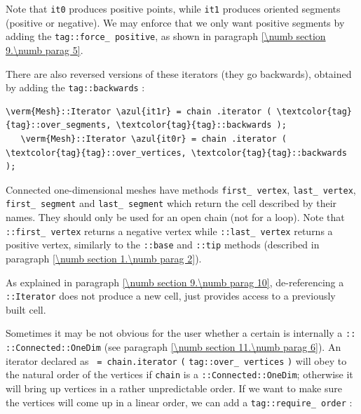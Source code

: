 Note that {\small\tt it0} produces positive points, while {\small\tt  it1} produces
oriented segments (positive or negative).
We may enforce that we only want positive segments by adding the
{\small\tt \textcolor{tag}{tag}::force\_\,positive}, as shown in paragraph \ref{\numb section 9.\numb parag 5}.

There are also reversed versions of these iterators (they go backwards), obtained by adding
the {\small\tt \textcolor{tag}{tag}::backwards} :

\begin{Verbatim}[commandchars=\\\{\},formatcom=\small\tt,
   baselinestretch=0.94,framesep=2mm                      ]
   \verm{Mesh}::Iterator \azul{it1r} = chain .iterator ( \textcolor{tag}{tag}::over_segments, \textcolor{tag}{tag}::backwards );
   \verm{Mesh}::Iterator \azul{it0r} = chain .iterator ( \textcolor{tag}{tag}::over_vertices, \textcolor{tag}{tag}::backwards );
\end{Verbatim}

Connected one-dimensional meshes have methods {\small\tt first\_\,vertex},
{\small\tt last\_\,vertex}, {\small\tt first\_\,segment} and {\small\tt last\_\,segment}
which return the cell described by their names.
They should only be used for an open chain (not for a loop).
Note that {\small\tt {}::first\_\,vertex} returns a negative vertex while
{\small\tt {}::last\_\,vertex} returns a positive vertex, similarly to the
{\small\tt {}::base} and {\small\tt {}::tip} methods (described in paragraph
\ref{\numb section 1.\numb parag 2}).

As explained in paragraph \ref{\numb section 9.\numb parag 10},
de-referencing a {\small\tt {}::Iterator} does not produce a new cell,
just provides access to a previously built cell.

Sometimes it may be not obvious for the user whether a certain {\small\tt {}}
is internally a {\small\tt {}:: ::Connected::OneDim}
(see paragraph \ref{\numb section 11.\numb parag 6}).
An iterator declared as {\small\tt {} = chain.iterator}\break
{\small\tt(} {\small\tt\textcolor{tag}{tag}::over\_\,vertices} {\small\tt)} will obey to
the natural order of the vertices if {\small\tt chain} is a\break
{\small\tt {}::Connected::OneDim}; otherwise it will bring up vertices
in a rather unpredictable order.
If we want to make sure the vertices will come up in a linear order, we can add a
{\small\tt \textcolor{tag}{tag}::require\_\,order} :

